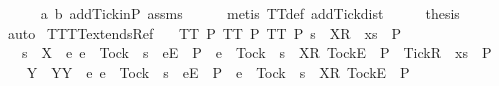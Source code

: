 \begin{isabellebody}
\ \ \ \ \isamarkupfalse%
\ a\ b\ add{\isacharunderscore}Tick{\isacharunderscore}in{\isacharunderscore}P\ assms\isanewline
\ \ \ \ \isamarkupfalse%
\ {\isacharparenleft}metis\ TT{}{\isacharunderscore}def\ add{\isacharunderscore}Tick{\isacharunderscore}dist{\isacharparenright}\isanewline
\ \ \isamarkupfalse%
\ \isamarkupfalse%
\ {\isacharquery}thesis\ \isamarkupfalse%
\ auto\isanewline
{}\isamarkupfalse%
%
\endisatagproof
{\isafoldproof}%
%
\isadelimproof
\isanewline
%
\endisadelimproof
\isanewline
{}\isamarkupfalse%
\ TT{}{\isacharunderscore}TT{}{\isacharunderscore}extends{\isacharunderscore}Ref{\isacharcolon}\isanewline
\ \ \ {\isachardoublequoteopen}TT{}\ P{\isachardoublequoteclose}\ {\isachardoublequoteopen}TT{}\ P{\isachardoublequoteclose}\ {\isachardoublequoteopen}TT{}\ P{\isachardoublequoteclose}\ {\isachardoublequoteopen}s\ {\isacharat}\ {\isacharbrackleft}{\isacharbrackleft}X{\isacharbrackright}\isactrlsub R{\isacharbrackright}\ {\isacharat}\ xs\ {\isasymin}\ P{\isachardoublequoteclose}\isanewline
\ \ \ {\isachardoublequoteopen}s\ {\isacharat}\ {\isacharbrackleft}{\isacharbrackleft}X\ {\isasymunion}\ {\isacharbraceleft}e{\isachardot}\ e\ {\isasymnoteq}\ Tock\ {\isasymand}\ s\ {\isacharat}\ {\isacharbrackleft}{\isacharbrackleft}e{\isacharbrackright}\isactrlsub E{\isacharbrackright}\ {\isasymnotin}\ P\ {\isasymor}\ e\ {\isacharequal}\ Tock\ {\isasymand}\ s\ {\isacharat}\ {\isacharbrackleft}{\isacharbrackleft}X{\isacharbrackright}\isactrlsub R{\isacharcomma}\ {\isacharbrackleft}Tock{\isacharbrackright}\isactrlsub E{\isacharbrackright}\ {\isasymnotin}\ P{\isacharbraceright}\ {\isasymunion}\ {\isacharbraceleft}Tick{\isacharbraceright}{\isacharbrackright}\isactrlsub R{\isacharbrackright}\ {\isacharat}\ xs\ {\isasymin}\ P{\isachardoublequoteclose}\isanewline
%
\isadelimproof
%
\endisadelimproof
%
\isatagproof
{}\isamarkupfalse%
\ {\isacharminus}\isanewline
\ \ \isamarkupfalse%
\ Y\ \ Y{\isacharcolon}{\isachardoublequoteopen}Y\ {\isacharequal}\ {\isacharbraceleft}e{\isachardot}\ e\ {\isasymnoteq}\ Tock\ {\isasymand}\ s\ {\isacharat}\ {\isacharbrackleft}{\isacharbrackleft}e{\isacharbrackright}\isactrlsub E{\isacharbrackright}\ {\isasymnotin}\ P\ {\isasymor}\ e\ {\isacharequal}\ Tock\ {\isasymand}\ s\ {\isacharat}\ {\isacharbrackleft}{\isacharbrackleft}X{\isacharbrackright}\isactrlsub R{\isacharcomma}\ {\isacharbrackleft}Tock{\isacharbrackright}\isactrlsub E{\isacharbrackright}\ {\isasymnotin}\ P{\isacharbraceright}{\isachardoublequoteclose}\isanewline

\end{isabellebody}
